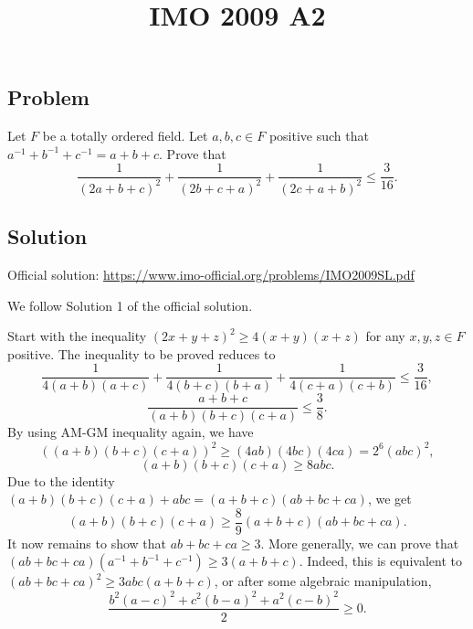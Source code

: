 \documentclass{article}
\title{IMO 2009 A2}
\author{}
\date{}
\begin{document}
\maketitle



\subsection*{Problem}

Let $F$ be a totally ordered field.
Let $a, b, c \in F$ positive such that $a^{-1} + b^{-1} + c^{-1} = a + b + c$.
Prove that
\[ \frac{1}{(2a + b + c)^2} + \frac{1}{(2b + c + a)^2} + \frac{1}{(2c + a + b)^2} \leq \frac{3}{16}. \]



\subsection*{Solution}

Official solution: \url{https://www.imo-official.org/problems/IMO2009SL.pdf}

We follow Solution 1 of the official solution.

Start with the inequality $(2x + y + z)^2 \geq 4(x + y)(x + z)$ for any $x, y, z \in F$ positive.
The inequality to be proved reduces to
\[ \frac{1}{4(a + b)(a + c)} + \frac{1}{4(b + c)(b + a)} + \frac{1}{4(c + a)(c + b)} \leq \frac{3}{16}, \]
\[ \frac{a + b + c}{(a + b)(b + c)(c + a)} \leq \frac{3}{8}. \]
By using AM-GM inequality again, we have
\[ ((a + b)(b + c)(c + a))^2 \geq (4ab)(4bc)(4ca) = 2^6 (abc)^2, \]
\[ (a + b)(b + c)(c + a) \geq 8abc. \]
Due to the identity $(a + b)(b + c)(c + a) + abc = (a + b + c)(ab + bc + ca)$, we get
\[ (a + b)(b + c)(c + a) \geq \frac{8}{9} (a + b + c)(ab + bc + ca). \]
It now remains to show that $ab + bc + ca \geq 3$.
More generally, we can prove that $(ab + bc + ca)(a^{-1} + b^{-1} + c^{-1}) \geq 3(a + b + c)$.
Indeed, this is equivalent to $(ab + bc + ca)^2 \geq 3 abc (a + b + c)$, or after some algebraic manipulation,
\[ \frac{b^2 (a - c)^2 + c^2 (b - a)^2 + a^2 (c - b)^2}{2} \geq 0. \]
\end{document}
